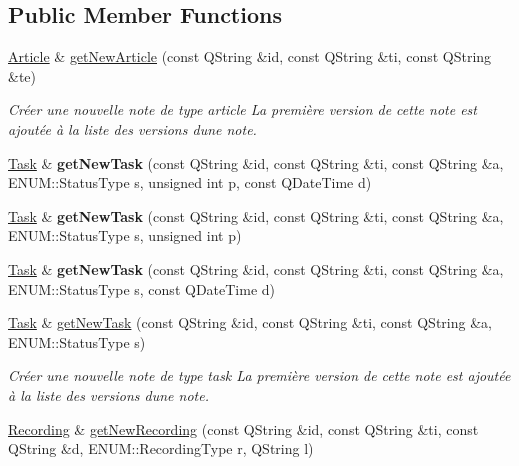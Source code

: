 \subsection*{Public Member Functions}
\begin{DoxyCompactItemize}
\item 
\hyperlink{class_article}{Article} \& \hyperlink{class_notes_manager_a44bfd4e7fe88b7f300a4be5589f92923}{get\+New\+Article} (const Q\+String \&id, const Q\+String \&ti, const Q\+String \&te)
\begin{DoxyCompactList}\small\item\em Créer une nouvelle note de type article La première version de cette note est ajoutée à la liste des versions d\textquotesingle{}une note. \end{DoxyCompactList}\item 
\mbox{\label{class_notes_manager_a33c72b86b61bd62c4816ae1eca30da58}} 
\hyperlink{class_task}{Task} \& {\bfseries get\+New\+Task} (const Q\+String \&id, const Q\+String \&ti, const Q\+String \&a, E\+N\+U\+M\+::\+Status\+Type s, unsigned int p, const Q\+Date\+Time d)
\item 
\mbox{\label{class_notes_manager_ab312c383347a12123deec4769949e6b7}} 
\hyperlink{class_task}{Task} \& {\bfseries get\+New\+Task} (const Q\+String \&id, const Q\+String \&ti, const Q\+String \&a, E\+N\+U\+M\+::\+Status\+Type s, unsigned int p)
\item 
\mbox{\label{class_notes_manager_ad6f9ba1dfaf507ca78669997f90fc615}} 
\hyperlink{class_task}{Task} \& {\bfseries get\+New\+Task} (const Q\+String \&id, const Q\+String \&ti, const Q\+String \&a, E\+N\+U\+M\+::\+Status\+Type s, const Q\+Date\+Time d)
\item 
\hyperlink{class_task}{Task} \& \hyperlink{class_notes_manager_a39562bf5aef0d7a113317c1421d578fd}{get\+New\+Task} (const Q\+String \&id, const Q\+String \&ti, const Q\+String \&a, E\+N\+U\+M\+::\+Status\+Type s)
\begin{DoxyCompactList}\small\item\em Créer une nouvelle note de type task La première version de cette note est ajoutée à la liste des versions d\textquotesingle{}une note. \end{DoxyCompactList}\item 
\hyperlink{class_recording}{Recording} \& \hyperlink{class_notes_manager_a71d0bc2e2716a4e558705ea76e3ad491}{get\+New\+Recording} (const Q\+String \&id, const Q\+String \&ti, const Q\+String \&d, E\+N\+U\+M\+::\+Recording\+Type r, Q\+String l)

\end{DoxyCompactItemize}
